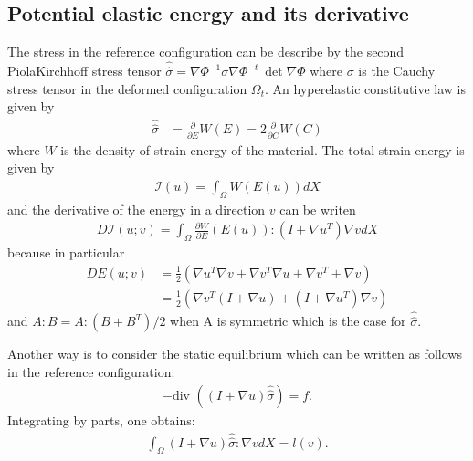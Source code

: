 \documentclass[a4paper,11pt,english]{sphinxmanual}
\begin{document}
\subsection{Potential elastic energy and its derivative}
\label{\detokenize{userdoc/model_nonlinear_elasticity:potential-elastic-energy-and-its-derivative}}
The stress in the reference configuration can be describe by the second Piola\sphinxhyphen{}Kirchhoff stress tensor \({\hat{\hat{\sigma}}} = \nabla\Phi^{-1}\sigma\nabla\Phi^{-t}~\det \nabla\Phi\) where \(\sigma\) is the Cauchy stress tensor in the deformed configuration \(\Omega_t\). An hyper\sphinxhyphen{}elastic constitutive law is given by
\begin{equation*}
\begin{split}{\hat{\hat{\sigma}}} &= \frac{\partial}{\partial E} {W}(E) = 2\frac{\partial}{\partial C} {W}(C)\end{split}
\end{equation*}
where \({W}\) is the density of strain energy of the material. The total strain energy is given by
\begin{equation*}
\begin{split}\mathcal{I}(u) = \int_{\Omega} W( E(u)) dX\end{split}
\end{equation*}
and the derivative of the energy in a direction \(v\) can be writen
\begin{equation*}
\begin{split}D\mathcal{I}(u;v) = \int_{\Omega} \frac{\partial W}{\partial E}( E(u)):(I+{\nabla u^T}){\nabla v}  dX\end{split}
\end{equation*}
because in particular
\begin{equation*}
\begin{split}D E(u;v) &= \frac{1}{2}({\nabla u^T}{\nabla v} + {\nabla v^T}{\nabla u} + {\nabla v^T} + {\nabla v})\\
&= \frac{1}{2}({\nabla v^T}(I+{\nabla u}) + (I+{\nabla u^T}){\nabla v})\end{split}
\end{equation*}
and \(A:B = A:(B+B^T)/2\) when A is symmetric which is the case for \({\hat{\hat{\sigma}}}\).

Another way is to consider the static equilibrium which can be written as follows in the reference configuration:
\begin{equation*}
\begin{split}-\mbox{div } \left((I+{\nabla u}){\hat{\hat{\sigma}}}\right) = f.\end{split}
\end{equation*}
Integrating by parts, one obtains:
\begin{equation*}
\begin{split}\int_{\Omega}(I + {\nabla u}){\hat{\hat{\sigma}}} : {\nabla v}  dX = l(v).\end{split}
\end{equation*}
\end{document}
